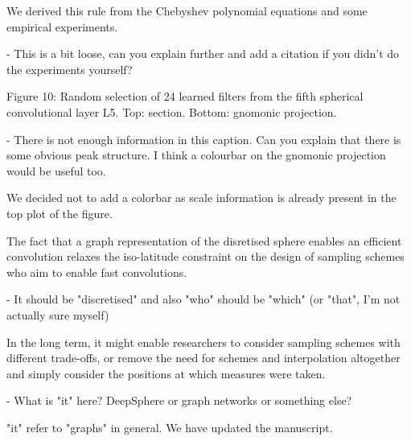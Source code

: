 \documentclass[12pt,a4paper]{article}
\newcommand{\nati}[1]{{\color[rgb]{.1,.6,.1}{NP: #1}}}
\newcommand{\todo}[1]{{\color[rgb]{.6,.1,.6}{TODO: #1}}}
\newcommand{\1}{\b{1}}              %
\newcommand{\0}{\b{0}}              %
\begin{document}
\begin{mdframed}[style=comment] 
We derived this rule from the Chebyshev polynomial equations and some empirical experiments.

- This is a bit loose, can you explain further and add a citation if you didn't do the experiments yourself?
\end{mdframed}
\todo{Assign: @nati, @michael}
\nati{We would need an appendix to do that. It is the last figure of the figure’s notebook (expected filter). I could spend two hours and write some equation... @michael, what do you think?}

\begin{mdframed}[style=comment] 
Figure 10: Random selection of 24 learned filters from the fifth spherical convolutional layer L5. Top: section. Bottom: gnomonic projection.

- There is not enough information in this caption. Can you explain that there is some obvious peak structure. I think a colourbar on the gnomonic projection would be useful too.
\end{mdframed}
\todo{Assign: @all}
\nati{The problem is that random filters are picky as well and look very similar. Should we say that? I do not think a colorbar is necessary since there are numbered axes on the top plots. Do you agree?}

We decided not to add a colorbar as scale information is already present in the top plot of the figure. 

\begin{mdframed}[style=comment] 
The fact that a graph representation of the disretised sphere enables an efficient convolution relaxes the iso-latitude constraint on the design of sampling schemes who aim to enable fast convolutions.

- It should be "discretised" and also "who" should be "which" (or "that", I'm not actually sure myself)
\end{mdframed}
\todo{Assign: @tomek -> \nati{I corrected it with "which". Do you agree? }}

\begin{mdframed}[style=comment] 
In the long term, it might enable researchers to consider sampling schemes with different trade-offs, or remove the need for schemes and interpolation altogether and simply consider the positions at which measures were taken.

- What is "it" here? DeepSphere or graph networks or something else?
\end{mdframed}
"it" refer to "graphs" in general. We have updated the manuscript.
\end{document}
